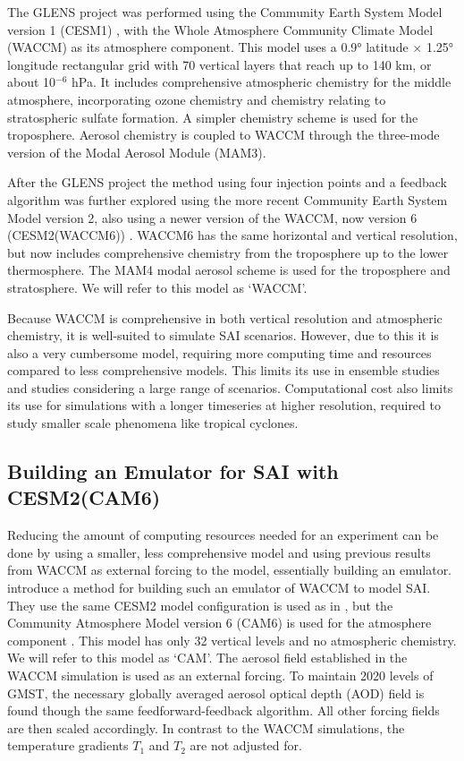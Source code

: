 The GLENS project was performed using the Community Earth System Model version 1 (CESM1) \parencite{hurrell2013}, with the Whole Atmosphere Community Climate Model (WACCM) as its atmosphere component. This model uses a 0.9° latitude $\times$ 1.25° longitude rectangular grid with 70 vertical layers that reach up to 140 km, or about 10$^{-6}$ hPa. It includes comprehensive atmospheric chemistry for the middle atmosphere, incorporating ozone chemistry and chemistry relating to stratospheric sulfate formation. A simpler chemistry scheme is used for the troposphere. Aerosol chemistry is coupled to WACCM through the three-mode version of the Modal Aerosol Module (MAM3).

After the GLENS project the method using four injection points and a feedback algorithm was further explored using the more recent Community Earth System Model version 2, also using a newer version of the WACCM, now version 6 (CESM2(WACCM6)) \parencite{tilmes2020}. WACCM6 has the same horizontal and vertical resolution, but now includes comprehensive chemistry from the troposphere up to the lower thermosphere. The MAM4 modal aerosol scheme is used for the troposphere and stratosphere. We will refer to this model as `WACCM'.

Because WACCM is comprehensive in both vertical resolution and atmospheric chemistry, it is well-suited to simulate SAI scenarios. However, due to this it is also a very cumbersome model, requiring more computing time and resources compared to less comprehensive models. This limits its use in ensemble studies and studies considering a large range of scenarios. Computational cost also limits its use for simulations with a longer timeseries at higher resolution, required to study smaller scale phenomena like tropical cyclones. 

\subsection{Building an Emulator for SAI with CESM2(CAM6)}
Reducing the amount of computing resources needed for an experiment can be done by using a smaller, less comprehensive model and using previous results from WACCM as external forcing to the model, essentially building an emulator. \textcite{pfluger2024} introduce a method for building such an emulator of WACCM to model SAI. They use the same CESM2 model configuration is used as in \textcite{tilmes2020}, but the Community Atmosphere Model version 6 (CAM6) is used for the atmosphere component \parencite{danabasoglu2020}. This model has only 32 vertical levels and no atmospheric chemistry. We will refer to this model as `CAM'. The aerosol field established in the WACCM simulation is used as an external forcing. To maintain 2020 levels of GMST, the necessary globally averaged aerosol optical depth (AOD) field is found though the same feedforward-feedback algorithm. All other forcing fields are then scaled accordingly. In contrast to the WACCM simulations, the temperature gradients $T_1$ and $T_2$ are not adjusted for. 

